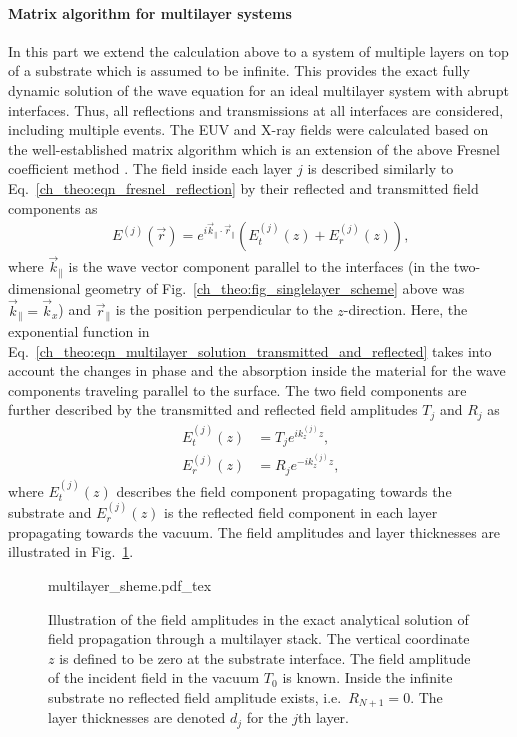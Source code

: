 \paragraph{Matrix algorithm for multilayer systems} \label{ch_theo:sec_matrix_algorithm}
In this part we extend the calculation above to a system of multiple layers on top of a substrate which is assumed to be infinite. This provides the exact fully dynamic solution of the wave equation for an ideal multilayer system with abrupt interfaces. Thus, all reflections and transmissions at all interfaces are considered, including multiple events. The EUV and X-ray fields were calculated based on the well-established matrix algorithm which is an extension of the above Fresnel coefficient method \cite{born_principles_1965,mikulik_x-ray_1997}. The field inside each layer $j$ is described similarly to Eq.~\eqref{ch_theo:eqn_fresnel_reflection} by their reflected and transmitted field components as
\begin{align}
E^{(j)}(\vec{r}) = e^{i \vec{k}_\parallel \cdot \vec{r}_\parallel} (E_t^{(j)}(z) + E_r^{(j)}(z)) \text{,} \label{ch_theo:eqn_multilayer_solution_transmitted_and_reflected}
\end{align}
where $\vec{k}_\parallel$ is the wave vector component parallel to the interfaces (in the two-dimensional geometry of Fig.~\ref{ch_theo:fig_singlelayer_scheme} above was $\vec{k}_\parallel = \vec{k}_x$) and $\vec{r}_\parallel$ is the position perpendicular to the $z$-direction. Here, the exponential function in Eq.~\eqref{ch_theo:eqn_multilayer_solution_transmitted_and_reflected} takes into account the changes in phase and the absorption inside the material for the wave components traveling parallel to the surface. The two field components are further described by the transmitted and reflected field amplitudes $T_j$ and $R_j$ as
\begin{align}
E_t^{(j)}(z) &= T_{j} e^{i k_z^{(j)} z} \text{,} \label{ch_theo:eqn_multilayer_amplitude_transmitted} \\
E_r^{(j)}(z) &= R_{j} e^{-i k_z^{(j)} z} \text{,} \label{ch_theo:eqn_multilayer_amplitude_reflected}
\end{align}
where $E_t^{(j)}(z)$ describes the field component propagating towards the substrate and $E_r^{(j)}(z)$ is the reflected field component in each layer propagating towards the vacuum. The field amplitudes and layer thicknesses are illustrated in Fig.~\ref{ch_theo:fig_multilayer_scheme}.
\begin{figure}[htb]
    {multilayer_sheme.pdf_tex}
    \caption[Field amplitudes in the exact solution for a multilayer system.]{Illustration of the field amplitudes in the exact analytical solution of field propagation through a multilayer stack. The vertical coordinate $z$ is defined to be zero at the substrate interface. The field amplitude of the incident field in the vacuum $T_0$ is known. Inside the infinite substrate no reflected field amplitude exists, i.e.~$R_{N+1} = 0$. The layer thicknesses are denoted $d_j$ for the $j$th layer.}
    \label{ch_theo:fig_multilayer_scheme}
\end{figure}
